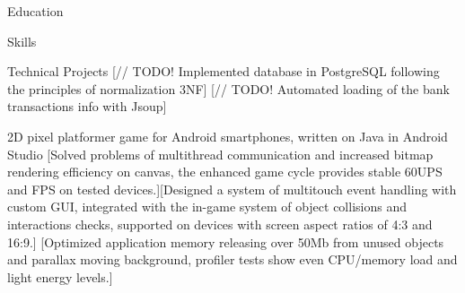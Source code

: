 



  
  

\begin{contactinfo}
\end{contactinfo}

\begin{resumesection}{Education}
\end{resumesection}

\begin{resumesection}{Skills}
\end{resumesection}

\begin{resumesection}{Technical Projects}
		[// TODO! Implemented database in PostgreSQL following the principles of normalization 3NF]
		[// TODO! Automated loading of the bank transactions info with Jsoup]
	    
			{2D pixel platformer game for Android smartphones, written on Java in Android Studio}
			[Solved problems of multithread communication and increased bitmap rendering efficiency on canvas, the enhanced game cycle provides stable 60UPS and FPS on tested devices.][Designed a system of multitouch event handling with custom GUI, integrated with the in-game system of object collisions and interactions checks, supported on devices with screen aspect ratios of 4:3 and 16:9.]
			[Optimized application memory releasing over 50Mb from unused objects and parallax moving background, profiler tests show even CPU/memory load and light energy levels.]
\end{resumesection}

